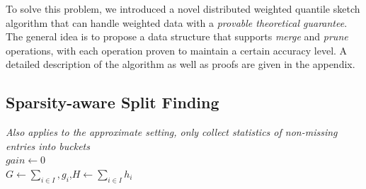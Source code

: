 To solve this problem, we introduced a novel distributed weighted quantile sketch algorithm that can handle weighted data with a
\emph{provable theoretical guarantee}. The general idea is to propose a data structure that supports \emph{merge} and \emph{prune}
operations, with each operation  proven to maintain a certain accuracy level. A detailed description of the algorithm as well as proofs are given in the appendix.

\subsection{Sparsity-aware Split Finding} \label{subsec:sparse}

\begin{algorithm}[!t]
    \caption{Sparsity-aware Split Finding}\label{alg:sparse-split}
    \emph{Also applies to the approximate setting, only collect statistics of non-missing entries into buckets}\\
    $gain\leftarrow 0$\\
    $G \leftarrow \sum_{i\in I},  g_{i}$,$H \leftarrow \sum_{i \in I} h_{i}$\\
\end{algorithm}

